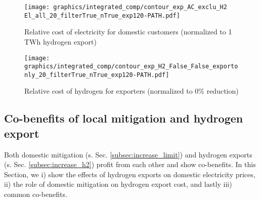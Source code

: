 \begin{figure*}[h!]
    \centering
    \begin{subfigure}[b]{0.49\linewidth}
        \centering
        \texttt{[image: graphics/integrated\_comp/contour\_exp\_AC\_exclu\_H2 El\_all\_20\_filterTrue\_nTrue\_exp120-PATH.pdf]}
        \caption{Relative cost of electricity for domestic customers (normalized to 1 TWh hydrogen export)}
        \label{fig:expense_ac_120}
    \end{subfigure}
    \hfill
    \begin{subfigure}[b]{0.49\linewidth}
        \centering
        \texttt{[image: graphics/integrated\_comp/contour\_exp\_H2\_False\_False\_exportonly\_20\_filterTrue\_nTrue\_exp120-PATH.pdf]}
        \caption{Relative cost of hydrogen for exporters (normalized to 0\% \co reduction)}
        \label{fig:expense_h2_120}
    \end{subfigure}
    \hfill
    \caption{  
    Cost for domestic electricity consumers (\ref{fig:expense_ac_120}) and hydrogen exporters (\ref{fig:expense_h2_120}),
    normalized to costs at 1 TWh hydrogen export (\ref{fig:expense_ac_120}) and
    to 0\% \co reduction (\ref{fig:expense_h2_120})
    at each mitigation level. Domestic electricity consumers profit from increasing hydrogen exports, especially at low domestic mitigation and high exports. Hydrogen exporters profit from domestic mitigation at medium mitigation efforts. Both (\ref{fig:expense_ac_120}) and (\ref{fig:expense_h2_120}) include possible pathways of i) quick exports and slow mitigation, ii) balanced exports and mitigation and iii) slow exports and quick mitigation.}
    \label{fig:expenses_default_120}
\end{figure*}







\subsection{Co-benefits of local mitigation and hydrogen export}
\label{subsec:benefits}

Both domestic mitigation (s. Sec. \ref{subsec:increase_limit}) and hydrogen exports (s. Sec. \ref{subsec:increase_h2}) profit from each other and show co-benefits. In this Section, we i) show the effects of hydrogen exports on domestic electricity prices, ii) the role of domestic mitigation on hydrogen export cost, and lastly iii) common co-benefits.

